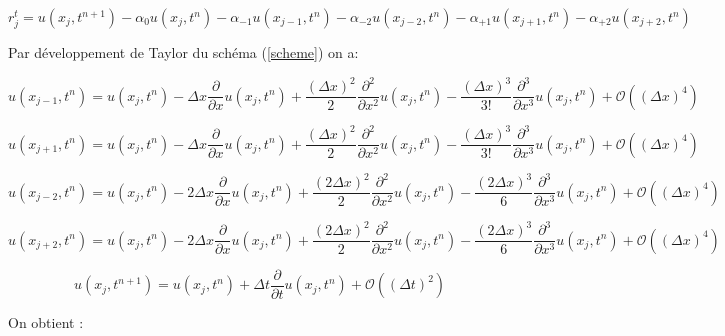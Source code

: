 \documentclass[a4paper,11pt]{article}
\begin{document}
\begin{equation*}
    r^{t}_{j} = u(x_{j}, t^{n+1}) -\alpha_{0} u(x_{j}, t^{n}) -\alpha_{-1} u(x_{j-1}, t^{n}) -\alpha_{-2} u(x_{j-2}, t^{n}) -\alpha_{+1} u(x_{j+1}, t^{n}) -\alpha_{+2} u(x_{j+2}, t^{n})
\end{equation*}

Par développement de Taylor du schéma (\ref{scheme}) on a:

\begin{equation*}
    u(x_{j-1}, t^{n}) =
    u(x_{j}, t^{n})
     - \Delta x \frac{\partial}{\partial x}u(x_{j}, t^{n})
     + \frac{(\Delta x)^{2}}{2} \frac{\partial^{2}}{\partial x^{2}}u(x_{j}, t^{n})
     - \frac{(\Delta x)^{3}}{3!} \frac{\partial^{3}}{\partial x^{3}}u(x_{j}, t^{n})
     + \mathcal{O}((\Delta x)^{4})
\end{equation*}

\begin{equation*}
    u(x_{j+1}, t^{n}) =
    u(x_{j}, t^{n})
     - \Delta x \frac{\partial}{\partial x}u(x_{j}, t^{n})
     + \frac{(\Delta x)^{2}}{2} \frac{\partial^{2}}{\partial x^{2}}u(x_{j}, t^{n})
     - \frac{(\Delta x)^{3}}{3!} \frac{\partial^{3}}{\partial x^{3}}u(x_{j}, t^{n})
     + \mathcal{O}((\Delta x)^{4})
\end{equation*}

\begin{equation*}
    u(x_{j-2}, t^{n}) =
    u(x_{j}, t^{n})
     - 2\Delta x \frac{\partial}{\partial x}u(x_{j}, t^{n})
     + \frac{(2\Delta x)^{2}}{2} \frac{\partial^{2}}{\partial x^{2}}u(x_{j}, t^{n})
     - \frac{(2\Delta x)^{3}}{6} \frac{\partial^{3}}{\partial x^{3}}u(x_{j}, t^{n})
     + \mathcal{O}((\Delta x)^{4})
\end{equation*}

\begin{equation*}
    u(x_{j+2}, t^{n}) =
    u(x_{j}, t^{n})
     - 2\Delta x \frac{\partial}{\partial x}u(x_{j}, t^{n})
     + \frac{(2\Delta x)^{2}}{2} \frac{\partial^{2}}{\partial x^{2}}u(x_{j}, t^{n})
     - \frac{(2\Delta x)^{3}}{6} \frac{\partial^{3}}{\partial x^{3}}u(x_{j}, t^{n})
     + \mathcal{O}((\Delta x)^{4})
\end{equation*}

\begin{equation*}
    u(x_{j}, t^{n+1}) =
    u(x_{j}, t^{n})    
     + \Delta t \frac{\partial}{\partial t}u(x_{j}, t^{n})
     + \mathcal{O}((\Delta t)^{2})
\end{equation*}

On obtient :
\end{document}
